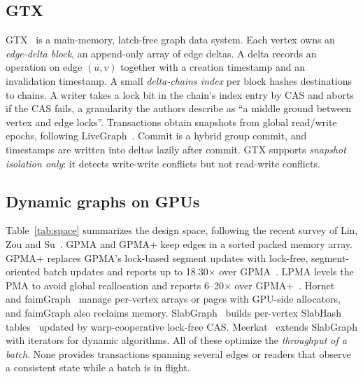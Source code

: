 \documentclass[sigconf,nonacm]{acmart}
\begin{document}
\subsection{GTX}
GTX~\cite{gtx} is a main-memory, latch-free graph data system. Each vertex owns an \emph{edge-delta block}, an
append-only array of edge deltas. A delta records an operation on edge $(u,v)$ together with a creation timestamp and
an invalidation timestamp. A small \emph{delta-chains index} per block hashes destinations to chains. A writer takes
a lock bit in the chain's index entry by CAS and aborts if the CAS fails, a granularity the authors describe as
``a middle ground between vertex and edge locks''. Transactions obtain snapshots from global read/write epochs,
following LiveGraph~\cite{livegraph}. Commit is a hybrid group commit, and timestamps are written into deltas lazily
after commit. GTX supports \emph{snapshot isolation only}: it detects write-write conflicts but not read-write
conflicts.

\subsection{Dynamic graphs on GPUs}
Table~\ref{tab:space} summarizes the design space, following the recent survey of Lin, Zou and Su~\cite{survey25}.
GPMA and GPMA+ keep edges in a sorted packed memory array. GPMA+ replaces GPMA's lock-based segment updates with
lock-free, segment-oriented batch updates and reports up to 18.30$\times$ over GPMA~\cite{gpma,gpmatr}. LPMA levels
the PMA to avoid global reallocation and reports 6--20$\times$ over GPMA+~\cite{lpma}. Hornet~\cite{hornet} and
faimGraph~\cite{faimgraph} manage per-vertex arrays or pages with GPU-side allocators, and faimGraph also reclaims
memory. SlabGraph~\cite{slabgraph} builds per-vertex SlabHash tables~\cite{slabhash} updated by warp-cooperative
lock-free CAS. Meerkat~\cite{meerkat} extends SlabGraph with iterators for dynamic algorithms. All of these optimize
the \emph{throughput of a batch}. None provides transactions spanning several edges or readers that observe a
consistent state while a batch is in flight.
\end{document}
